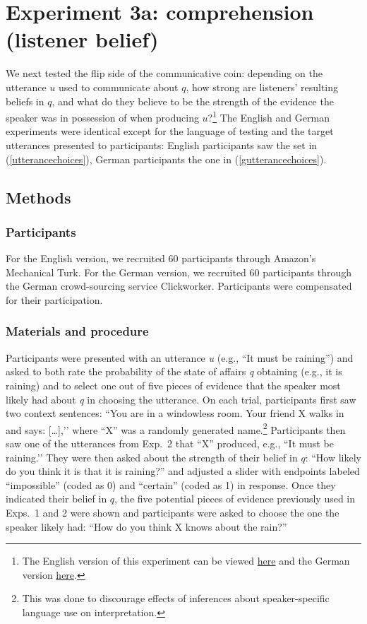 \documentclass[11pt]{article}
\newcommand{\eref}[1]{(\ref{#1})}
\begin{document}
\section{Experiment 3a: comprehension (listener belief)}


We next tested the flip side of the communicative coin: depending on the utterance $u$ used to communicate about $q$, how strong are listeners' resulting beliefs in $q$, and what do they believe to be the strength of the evidence the speaker was in possession of when producing $u$?\footnote{The English version of this experiment can be viewed \href{http://stanford.edu/~jdegen/72_modals_comprehension_evidence_room/modals.html}{here} and the German version \href{http://web.stanford.edu/~jdegen/cgi-bin/2_dp_comprehension_listenerbelief/modals.html}{here}.} The English and German experiments were identical except for the language of testing and the target utterances presented to participants: English participants saw the set in \eref{utterancechoices},  German participants the one in \eref{gutterancechoices}.

\subsection{Methods}

\subsubsection{Participants}

For the English version, we recruited 60 participants through Amazon's Mechanical Turk. 
For the German version, we recruited 60 participants through the German crowd-sourcing service Clickworker. Participants were compensated for their participation.

\subsubsection{Materials and procedure}

Participants were presented with an utterance \emph{u} (e.g., ``It must be raining'') and asked to both rate the probability of the state of affairs \emph{q} obtaining (e.g., it is raining) and to select one out of five pieces of evidence that the speaker most likely had about \emph{q} in choosing the utterance. On each trial, participants first saw two context sentences: ``You are in a windowless room. Your friend X walks in and says: […],’’ where ``X'' was a randomly generated name.\footnote{This was done to discourage effects of inferences about speaker-specific language use on interpretation.} Participants then saw one of the utterances from Exp.~2 that ``X'' produced, e.g., ``It must be raining.’’ They were then asked about the strength of their belief in $q$: ``How likely do you think it is that it is raining?'' and adjusted a slider with endpoints labeled ``impossible'' (coded as 0) and ``certain'' (coded as 1) in response. Once they indicated their belief in $q$, the five potential pieces of evidence previously used in Exps.~1 and 2 were shown and participants were asked to choose the one the speaker likely had: ``How do you think X knows about the rain?'' 
\end{document}
